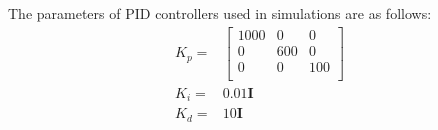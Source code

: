\documentclass{article}
\begin{document}
The parameters of PID controllers used in simulations are as follows:
\[
    \begin{aligned}
        K_p = & \begin{bmatrix}
            1000 & 0 & 0 \\
            0 & 600 & 0 \\
            0 & 0 & 100 \\
        \end{bmatrix} \\
        K_i = & 0.01 \mathbf I \\
        K_d = & 10 \mathbf I
    \end{aligned}
\]
\end{document}
